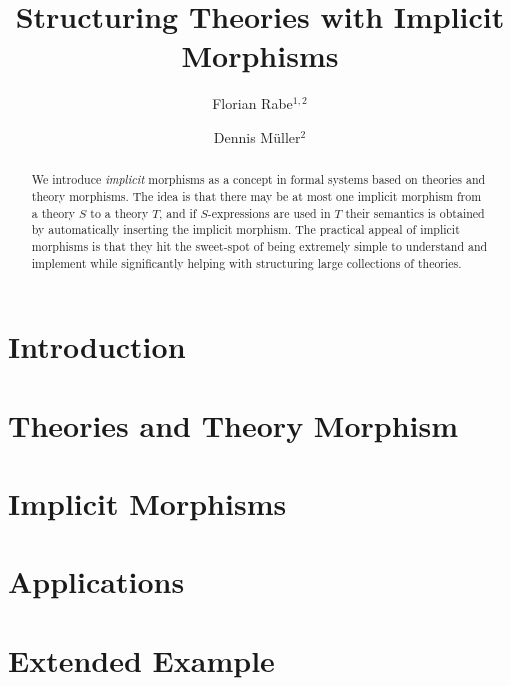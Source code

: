 \documentclass[orivec]{llncs}
\begin{document}
\title{Structuring Theories with Implicit Morphisms}
\author{Florian Rabe$^{1,2}$ \and Dennis M\"uller$^2$}
\maketitle

\begin{abstract}
We introduce \emph{implicit} morphisms as a concept in formal systems based on theories and theory morphisms.
The idea is that there may be at most one implicit morphism from a theory $S$ to a theory $T$, and if $S$-expressions are used in $T$ their semantics is obtained by automatically inserting the implicit morphism.
The practical appeal of implicit morphisms is that they hit the sweet-spot of being extremely simple to understand and implement while significantly helping with structuring large collections of theories.
\end{abstract}


\section{Introduction}


\section{Theories and Theory Morphism}


%

\section{Implicit Morphisms}


\section{Applications}


\section{Extended Example}


%
\end{document}
